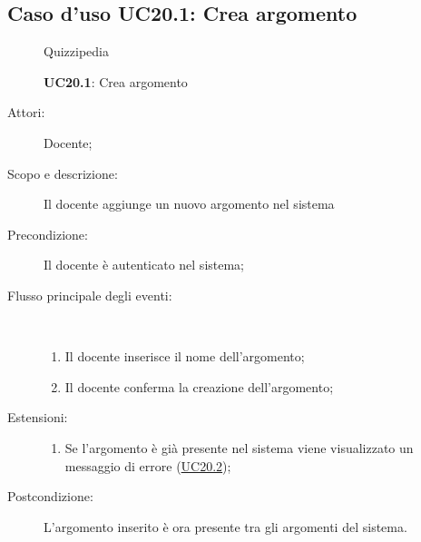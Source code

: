 \subsection{Caso d'uso UC20.1: Crea argomento}
\begin{figure}[H]
	\centering
	\begin{resizedtikzpicture}{\textwidth}
		\begin{umlsystem}[x=0, fill=lightgray!20]{Quizzipedia}
		\end{umlsystem}
	\end{resizedtikzpicture}
	\caption{\textbf{UC20.1}: Crea argomento}
	\label{UC20.1}
\end{figure}
\begin{description}
	\item[Attori:] Docente;
	\item[Scopo e descrizione:] Il docente aggiunge un nuovo argomento nel sistema
	\item[Precondizione:] Il docente è autenticato nel sistema;
	
	\item[Flusso principale degli eventi:] \ 
	\begin{enumerate}
		\item Il docente inserisce il nome dell'argomento;
		\item Il docente conferma la creazione dell'argomento;
		
	\end{enumerate}
	\item[Estensioni:]
	\begin{enumerate}
		\item Se l'argomento è già presente nel sistema viene visualizzato un messaggio di errore (\hyperlink{UC20.2}{UC20.2});
		
	\end{enumerate}
	\item[Postcondizione:] L'argomento inserito è ora presente tra gli argomenti del sistema.
\end{description}
\hypertarget{UC20.2}{}
